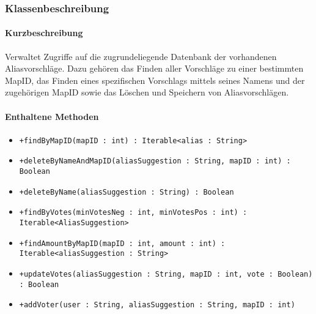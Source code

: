 \subsubsection*{Klassenbeschreibung}%
\paragraph*{Kurzbeschreibung}
Verwaltet Zugriffe auf die zugrundeliegende Datenbank der vorhandenen Aliasvorschläge.
Dazu gehören das Finden aller Vorschläge zu einer bestimmten MapID, das Finden eines spezifischen Vorschlags mittels 
seines Namens und der zugehörigen MapID sowie das Löschen und Speichern von Aliasvorschlägen.
\paragraph*{Enthaltene Methoden}
\begin{itemize}
    \item \texttt{+findByMapID(mapID : int) : Iterable<alias : String>}
    \item \texttt{+deleteByNameAndMapID(aliasSuggestion : String, mapID : int) : Boolean}
    \item \texttt{+deleteByName(aliasSuggestion : String) : Boolean}
    \item \texttt{+findByVotes(minVotesNeg : int, minVotesPos : int) : Iterable<AliasSuggestion>}
    \item \texttt{+findAmountByMapID(mapID : int, amount : int) : Iterable<aliasSuggestion : String>}
    \item \texttt{+updateVotes(aliasSuggestion : String, mapID : int, vote : Boolean) : Boolean}
    \item \texttt{+addVoter(user : String, aliasSuggestion : String, mapID : int)}
\end{itemize}
